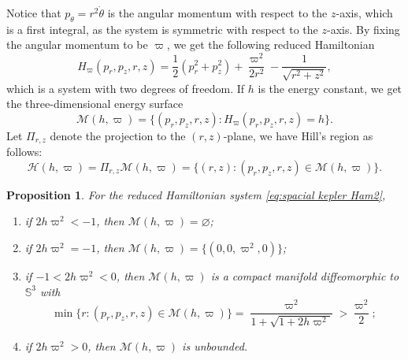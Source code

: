 \documentclass[11pt]{amsart}
\newcommand{\M}{\mathcal M}
\newcommand{\tht}{\theta}
\newcommand{\om}{\varpi}
\newtheorem{prop}{Proposition}[section]
\begin{document}
Notice that $p_{\tht} = r^2 \dot{\tht}$ is the angular momentum with respect to the $z$-axis, which is a first integral, as the system is symmetric with respect to the $z$-axis. By fixing the angular momentum to be $\om$, we get the following reduced Hamiltonian
\begin{equation}\label{eq:spacial kepler Ham2}
	H_{\om}(p_r,p_z,r,z)=\frac{1}{2}(p_{r}^{2}+p_{z}^{2})+\frac{\om^2}{2r^2}-\frac{1}{\sqrt{r^{2}+z^{2}}},
\end{equation}
which is a system with two degrees of freedom. If $h$ is the energy constant, we get the three-dimensional energy surface 
$$ \M(h, \om) = \{ (p_r, p_z, r, z): H_{\om} (p_r, p_z, r, z)= h \}.$$ 
Let $\Pi_{r,z}$ denote the projection to the $(r, z)$-plane, we have Hill's region as follows:
$$ \mathcal{H}(h, \om) = \Pi_{r, z} \M(h, \om)= \{ (r, z): (p_r, p_z, r, z) \in \M(h, \om)\}. $$
\begin{prop}\label{prop;diffeomorphic to S3 1}
	For the reduced Hamiltonian system \eqref{eq:spacial kepler Ham2},  
	\begin{enumerate}
		\item[(a)] if $2h\om^2<-1$, then $\mathcal{M}(h,\om)=\varnothing$; 
		\item[(b)] if $2h\om^2=-1$, then $\mathcal{M}(h,\om)=\{(0,0,\om^2,0)\}$;
		\item[(c)] if $-1<2h\om^2<0$, then $\mathcal{M}(h,\om)$ is a compact manifold diffeomorphic to $\mathbb{S}^{3}$ with
		$$ \min\{ r: (p_r, p_z, r,z ) \in \mathcal{M}(h, \om) \}=\frac{\om^2}{1+\sqrt{1+2h\om^2}}>\frac{\om^2}{2}; $$
		\item[(d)] if $2h\om^2>0$, then $\mathcal{M}(h,\om)$ is unbounded.
	\end{enumerate}
\end{prop}
\end{document}
